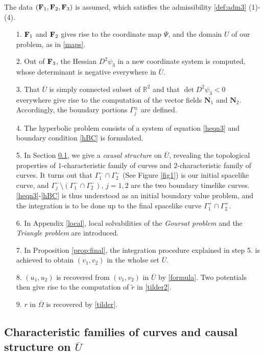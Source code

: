 \documentclass[11pt]{amsart}
\theoremstyle{plain}
\theoremstyle{remark}
\numberwithin{equation}{section}
\numberwithin{Thm}{section}
\def\U{\overline{U}}
\def\N{{\mathbf N}}
\def\F{{\bf F}}
\begin{document}
The data $(\F_1,\F_2,\F_3)$ is assumed, which satisfies the admissibility \ref{def:adm3} (1)-(4). 
\begin{enumerate}
 \item[1.] $\F_1$ and $\F_2$ gives rise to the coordinate map $\Psi$, and the domain $U$ of our problem, as in \eqref{maps}.
 \item[2.] Out of $\F_3$, the Hessian $D^2\psi_3$ in a new coordinate system is computed, whose determinant is negative everywhere in $\U$.
 \item[3.] That $\U$ is simply connected subset of $\mathbb{R}^2$ and that $\det D^2\psi_3 < 0$ everywhere give rise to the computation of the vector fields $\N_1$ and $\N_2$. Accordingly, the boundary portions $\Gamma^\pm_j$ are defined.
 \item[4.] The hyperbolic problem consists of a system of equation \eqref{heqn3} and boundary condition \eqref{hBC} is formulated.
 \item[5.] In Section \ref{causal}, we give a {\it causal structure} on $\U$, revealing the topological properties of $1$-characteristic family of curves and $2$-characteristic family of curves. It turns out that $\Gamma^-_1 \cap \Gamma^-_2$  (See Figure \ref{fig1}) is our initial spacelike curve, and $\Gamma^-_j \setminus (\Gamma^-_1 \cap \Gamma^-_2)$, $j=1,2$ are the two boundary timelike curves. \eqref{heqn3}-\eqref{hBC} is thus understood as an initial boundary value problem, and the integration is to be done up to the final spacelike curve $\Gamma^+_1 \cap \Gamma^+_2$. 
 \item[6.] In Appendix \ref{local}, local solvabilities of the {\it Goursat problem} and the {\it Triangle problem} are introduced. 
 \item[7.] In Proposition \ref{prop:final}, the integration procedure explained in step 5. is achieved to obtain $(v_1,v_2)$  in the wholse set $\U$. 
 \item[8.] $(u_1,u_2)$ is recovered from $(v_1,v_2)$ in $\U$ by \eqref{formula}. Two potentials then give rise to the computation of $\tilde {r}$ in \eqref{tilder2}.
 \item[9.] $r$ in $\overline{\Omega}$ is recovered by \eqref{tilder}.
\end{enumerate}





\subsection{Characteristic families of curves and causal structure on $\U$} \label{causal}
\end{document}

